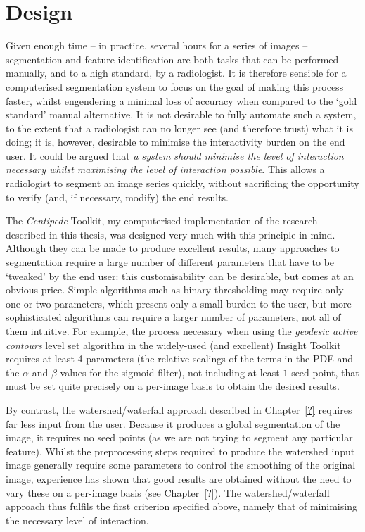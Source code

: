 \chapter{Design}

Given enough time -- in practice, several hours for a series of images -- segmentation and feature identification are both tasks that can be performed manually, and to a high standard, by a radiologist. It is therefore sensible for a computerised segmentation system to focus on the goal of making this process faster, whilst engendering a minimal loss of accuracy when compared to the `gold standard' manual alternative. It is not desirable to fully automate such a system, to the extent that a radiologist can no longer see (and therefore trust) what it is doing; it is, however, desirable to minimise the interactivity burden on the end user. It could be argued that \emph{a system should minimise the level of interaction necessary whilst maximising the level of interaction possible}. This allows a radiologist to segment an image series quickly, without sacrificing the opportunity to verify (and, if necessary, modify) the end results.

The \emph{Centipede} Toolkit, my computerised implementation of the research described in this thesis, was designed very much with this principle in mind. Although they can be made to produce excellent results, many approaches to segmentation require a large number of different parameters that have to be `tweaked' by the end user: this customisability can be desirable, but comes at an obvious price. Simple algorithms such as binary thresholding may require only one or two parameters, which present only a small burden to the user, but more sophisticated algorithms can require a larger number of parameters, not all of them intuitive. For example, the process necessary when using the \emph{geodesic active contours} level set algorithm in the widely-used (and excellent) Insight Toolkit \cite{?} requires at least 4 parameters (the relative scalings of the terms in the PDE  and the $\alpha$ and $\beta$ values for the sigmoid filter), not including at least $1$ seed point, that must be set quite precisely on a per-image basis to obtain the desired results.

By contrast, the watershed/waterfall approach \cite{?} described in Chapter~\ref{?} requires far less input from the user. Because it produces a global segmentation of the image, it requires no seed points (as we are not trying to segment any particular feature). Whilst the preprocessing steps required to produce the watershed input image generally require some parameters to control the smoothing of the original image, experience has shown that good results are obtained without the need to vary these on a per-image basis (see Chapter~\ref{?}). The watershed/waterfall approach thus fulfils the first criterion specified above, namely that of minimising the necessary level of interaction.

